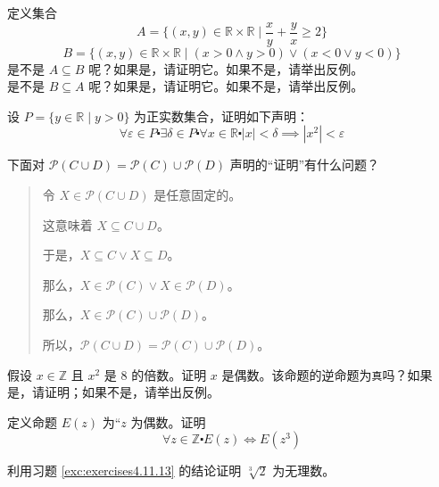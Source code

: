 \begin{exercise}
    定义集合
    \[A = \Big\{(x, y) \in \mathbb{R} \times \mathbb{R} \mid \frac{x}{y}+\frac{y}{x} \ge 2\Big\}\]
    \[B = \{(x, y) \in \mathbb{R} \times \mathbb{R} \mid (x>0 \land y>0) \lor (x<0 \lor y<0)\}\]
    是不是 $A \subseteq B$ 呢？如果是，请证明它。如果不是，请举出反例。\\
    是不是 $B \subseteq A$ 呢？如果是，请证明它。如果不是，请举出反例。
\end{exercise}

\begin{exercise}
    设 $P = \{y \in \mathbb{R} \mid y > 0\}$ 为正实数集合，证明如下声明：
    \[\forall \varepsilon \in P \centerdot \exists \delta \in P \centerdot \forall x \in \mathbb{R} \centerdot |x| < \delta \implies|x^2| < \varepsilon\]
\end{exercise}

\begin{exercise}
    下面对 $\mathcal{P}(C \cup D) = \mathcal{P}(C) \cup \mathcal{P}(D)$ 声明的``证明''有什么问题？
    \begin{quote}
        令 $X \in \mathcal{P}(C \cup D)$ 是任意固定的。

        这意味着 $X \subseteq C \cup D$。

        于是，$X \subseteq C \lor X \subseteq D$。

        那么，$X \in \mathcal{P}(C) \lor X \in \mathcal{P}(D)$。
        
        那么，$X \in \mathcal{P}(C) \cup \mathcal{P}(D)$。

        所以，$\mathcal{P}(C \cup D) = \mathcal{P}(C) \cup \mathcal{P}(D)$。
    \end{quote}
\end{exercise}

\begin{exercise}
    假设 $x \in \mathbb{Z}$ 且 $x^2$ 是 $8$ 的倍数。证明 $x$ 是偶数。该命题的逆命题为\verb|真|吗？如果是，请证明；如果不是，请举出反例。
\end{exercise}

\begin{exercise} \label{exc:exercises4.11.13}
    定义命题 $E(z)$ 为``$z$ 为偶数。证明
    \[\forall z \in \mathbb{Z} \centerdot E(z) \iff E(z^3)\]
\end{exercise}

\begin{exercise}
    利用习题 \ref{exc:exercises4.11.13} 的结论证明 $\sqrt[3]{2}$ 为无理数。
\end{exercise}

